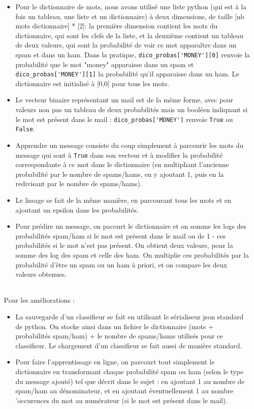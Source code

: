 \documentclass{report}
\begin{document}
\begin{itemize}
\item Pour le dictionnaire de mots, nous avons utilisé une liste python (qui est à la fois un tableau, une liste et un dictionnaire) à deux dimensions, de taille [nb mots dictionnaire] * [2]: la première dimension contient les mots du dictionnaire, qui sont les clefs de la liste, et la deuxième contient un tableau de deux valeurs, qui sont la probabilité de voir ce mot apparaître dans un spam et dans un ham. Dans la pratique, \verb|dico_probas['MONEY'][0]| renvoie la probabilité que le mot "money" apparaisse dans un spam et \verb|dico_probas['MONEY'][1]| la probabilité qu'il apparaisse dans un ham. Le dictionnaire est initialisé à [0,0] pour tous les mots.
\item Le vecteur binaire représentant un mail est de la même forme, avec pour valeurs non pas un tableau de deux probabilités mais un booléen indiquant si le mot est présent dans le mail : \verb|dico_probas['MONEY']| renvoie \verb|True| ou \verb|False|.
\item Apprendre un message consiste du coup simplement à parcourir les mots du message qui sont à \verb|True| dans son vecteur et à modifier la probabilité correspondante à ce mot dans le dictionnaire (en multipliant l'ancienne probabilité par le nombre de spams/hams, en y ajoutant 1, puis en la redivisant par le nombre de spams/hams).
\item Le lissage se fait de la même manière, en parcourant tous les mots et en ajoutant un epsilon dans les probabilités.
\item Pour prédire un message, on pacourt le dictionnaire et on somme les logs des probabilités spam/ham si le mot est présent dans le mail ou de 1 - ces probabilités si le mot n'est pas présent. On obtient deux valeurs, pour la somme des log des spam et celle des ham. On multiplie ces probabilités par la probabilité d'être un spam ou un ham à priori, et on compare les deux valeurs obtenues.
\end{itemize}
\ \\
\noindent Pour les améliorations : 
\begin{itemize}
\item La sauvegarde d'un classifieur se fait en utilisant le sérialiseur json standard de python. On stocke ainsi dans un fichier le dictionnaire (mots + probabilités spam/ham) + le nombre de spams/hams utilisés pour ce classifieur. Le chargement d'un classifieur se fait aussi de manière standard.
\item Pour faire l'apprentissage en ligne, on parcourt tout simplement le dictionnaire en transformant chaque probabilité spam ou ham (selon le type du message ajouté) tel que décrit dans le sujet : en ajoutant 1 au nombre de spam/ham au dénominateur, et en ajoutant éventuellement 1 au nombre 'occurences du mot au numérateur (si le mot est présent dans le mail). 
\end{itemize}
\end{document}
